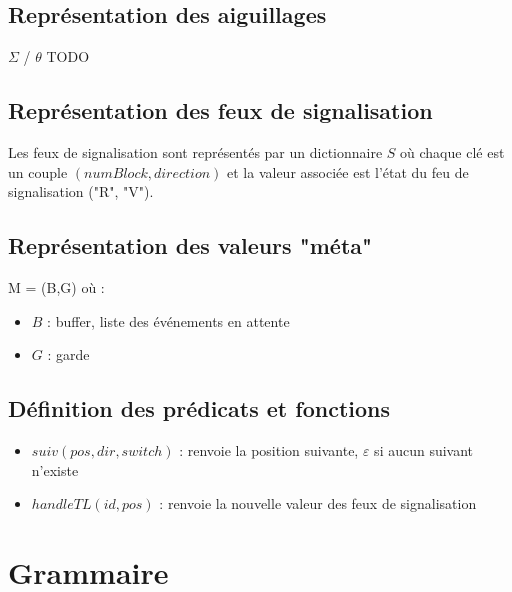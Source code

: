 \documentclass[12pt]{article}
\begin{document}
\subsection{Représentation des aiguillages}
$\Sigma$ / $\theta$ TODO

\subsection{Représentation des feux de signalisation}
Les feux de signalisation sont représentés par un dictionnaire $S$ où chaque clé
est un couple $(numBlock, direction)$ et la valeur associée est l'état du feu de signalisation ("R", "V").

\subsection{Représentation des valeurs "méta"}
M = (B,G) où :
\begin{itemize}
    \item $B$ : buffer, liste des événements en attente
    \item $G$ : garde
\end{itemize}

\subsection{Définition des prédicats et fonctions}

\begin{itemize}
    \item $suiv(pos, dir, switch)$ : renvoie la position suivante, $\varepsilon$ si aucun suivant n'existe
    \item $handleTL(id, pos)$ : renvoie la nouvelle valeur des feux de signalisation
\end{itemize}


\section{Grammaire}



\begin{grammar}
    \otherform{\varepsilon }{}
\end{grammar}
\end{document}
